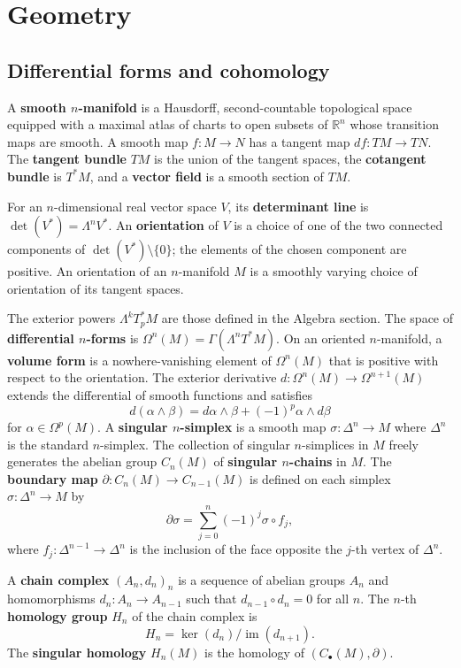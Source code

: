 \documentclass{article}
\newcommand{\im}{\operatorname{im}}
\begin{document}
\section{Geometry}

\subsection{Differential forms and cohomology}

A \textbf{smooth $n$-manifold} is a Hausdorff, second-countable topological
space equipped with a maximal atlas of charts to open subsets of
$\mathbb R^n$ whose transition maps are smooth. A smooth map $f:M\to N$ has
a tangent map $df:TM\to TN$. The \textbf{tangent bundle} $TM$ is the union
of the tangent spaces, the \textbf{cotangent bundle} is $T^*M$, and a
\textbf{vector field} is a smooth section of $TM$.

For an $n$-dimensional real vector space $V$, its \textbf{determinant line}
is $\det(V^*)=\Lambda^nV^*$.
An \textbf{orientation} of $V$ is a choice of one of the two connected
components of $\det(V^*)\setminus\{0\}$; the elements of the chosen component
are positive. An orientation of an $n$-manifold $M$ is a smoothly varying
choice of orientation of its tangent spaces.

The exterior powers $\Lambda^kT_p^*M$ are those defined in the Algebra section. The space of \textbf{differential $n$-forms} is $\Omega^n(M)=\Gamma(\Lambda^nT^*M)$. On an oriented $n$-manifold, a \textbf{volume form} is a nowhere-vanishing element of $\Omega^n(M)$ that is positive with respect to the orientation. The exterior derivative $d:\Omega^n(M)\to\Omega^{n+1}(M)$ extends the differential of smooth functions and satisfies
\[
d(\alpha\wedge\beta)=d\alpha\wedge\beta+(-1)^p\alpha\wedge d\beta
\]
for $\alpha\in\Omega^p(M)$. A \textbf{singular $n$-simplex} is a smooth map $\sigma:\Delta^n \to M$ where $\Delta^n$ is the standard $n$-simplex. The collection of singular $n$-simplices in $M$ freely generates the abelian group $C_n(M)$ of \textbf{singular $n$-chains} in $M$. The \textbf{boundary map} $\partial : C_n(M) \to C_{n-1}(M)$ is defined on each simplex $\sigma:\Delta^n \to M$ by
$$\partial\sigma=\sum_{j=0}^{n}(-1)^j\sigma\circ f_j,$$ where $f_j : \Delta^{n-1} \to \Delta^n$ is the inclusion of the face opposite the $j$-th vertex of $\Delta^n$.

A \textbf{chain complex} $(A_n, d_n)_n$ is a sequence of abelian groups $A_n$ and homomorphisms $d_n : A_n \to A_{n-1}$ such that $d_{n-1} \circ d_n = 0$ for all $n$. The $n$-th \textbf{homology group} $H_n$ of the chain complex is
$$H_n = \ker(d_{n}) / \im(d_{n+1}).$$
The \textbf{singular homology} $H_n(M)$ is the homology of
$(C_\bullet(M),\partial)$.
\end{document}
